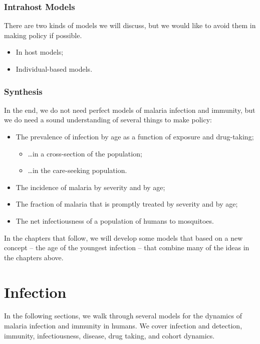 \documentclass[
]{book}
\begin{document}
\subsection{Intrahost Models}\label{intrahost-models}

There are two kinds of models we will discuss, but we would like to avoid them in making policy if possible.

\begin{itemize}
\item
  In host models;
\item
  Individual-based models.
\end{itemize}

\subsection{Synthesis}\label{synthesis}

In the end, we do not need perfect models of malaria infection and immunity, but we do need a sound understanding of several things to make policy:

\begin{itemize}
\item
  The prevalence of infection by age as a function of exposure and drug-taking;

  \begin{itemize}
  \item
    \ldots in a cross-section of the population;
  \item
    \ldots in the care-seeking population.
  \end{itemize}
\item
  The incidence of malaria by severity and by age;
\item
  The fraction of malaria that is promptly treated by severity and by age;
\item
  The net infectiousness of a population of humans to mosquitoes.
\end{itemize}

In the chapters that follow, we will develop some models that based on a new concept -- the age of the youngest infection -- that combine many of the ideas in the chapters above.

\chapter{Infection}\label{infection-2}

In the following sections, we walk through several models for the dynamics of malaria infection and immunity in humans. We cover infection and detection, immunity, infectiousness, disease, drug taking, and cohort dynamics.
\end{document}
